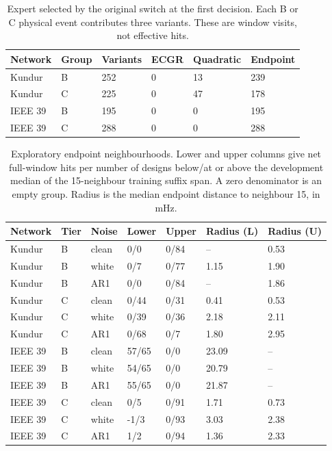 \documentclass[10pt]{article}
\begin{document}
\begin{table}[htbp]\centering\small
\caption{Expert selected by the original switch at the first decision. Each B or C physical event contributes three variants. These are window visits, not effective hits.}\label{tab:visits}
\begin{tabular}{@{}llllll@{}}\toprule
Network & Group & Variants & ECGR & Quadratic & Endpoint \\\midrule
Kundur & B & 252 & 0 & 13 & 239 \\
Kundur & C & 225 & 0 & 47 & 178 \\
IEEE 39 & B & 195 & 0 & 0 & 195 \\
IEEE 39 & C & 288 & 0 & 0 & 288 \\
\bottomrule\end{tabular}\end{table}\begin{table}[htbp]\centering\small
\caption{Exploratory endpoint neighbourhoods. Lower and upper columns give net full-window hits per number of designs below/at or above the development median of the 15-neighbour training suffix span. A zero denominator is an empty group. Radius is the median endpoint distance to neighbour 15, in mHz.}\label{tab:near}
\begin{tabular}{@{}lllllll@{}}\toprule
Network & Tier & Noise & Lower & Upper & Radius (L) & Radius (U) \\\midrule
Kundur & B & clean & 0/0 & 0/84 & -- & 0.53 \\
Kundur & B & white & 0/7 & 0/77 & 1.15 & 1.90 \\
Kundur & B & AR1 & 0/0 & 0/84 & -- & 1.86 \\
Kundur & C & clean & 0/44 & 0/31 & 0.41 & 0.53 \\
Kundur & C & white & 0/39 & 0/36 & 2.18 & 2.11 \\
Kundur & C & AR1 & 0/68 & 0/7 & 1.80 & 2.95 \\
IEEE 39 & B & clean & 57/65 & 0/0 & 23.09 & -- \\
IEEE 39 & B & white & 54/65 & 0/0 & 20.79 & -- \\
IEEE 39 & B & AR1 & 55/65 & 0/0 & 21.87 & -- \\
IEEE 39 & C & clean & 0/5 & 0/91 & 1.71 & 0.73 \\
IEEE 39 & C & white & -1/3 & 0/93 & 3.03 & 2.38 \\
IEEE 39 & C & AR1 & 1/2 & 0/94 & 1.36 & 2.33 \\
\bottomrule\end{tabular}\end{table}
\end{document}
